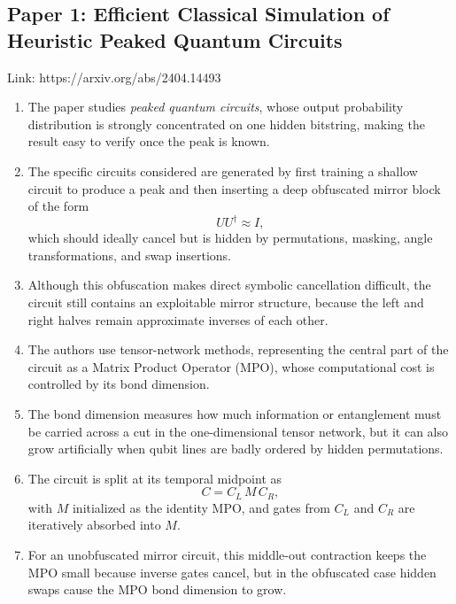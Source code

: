 \subsection{Paper 1: Efficient Classical Simulation of Heuristic Peaked Quantum Circuits}

Link: https://arxiv.org/abs/2404.14493

\begin{enumerate}
    \item The paper studies \emph{peaked quantum circuits}, whose output probability distribution is strongly concentrated on one hidden bitstring, making the result easy to verify once the peak is known.
    
    \item The specific circuits considered are generated by first training a shallow circuit to produce a peak and then inserting a deep obfuscated mirror block of the form
    \[
        U U^\dagger \approx I,
    \]
    which should ideally cancel but is hidden by permutations, masking, angle transformations, and swap insertions.
    
    \item Although this obfuscation makes direct symbolic cancellation difficult, the circuit still contains an exploitable mirror structure, because the left and right halves remain approximate inverses of each other.
    
    \item The authors use tensor-network methods, representing the central part of the circuit as a Matrix Product Operator (MPO), whose computational cost is controlled by its bond dimension.
    
    \item The bond dimension measures how much information or entanglement must be carried across a cut in the one-dimensional tensor network, but it can also grow artificially when qubit lines are badly ordered by hidden permutations.
    
    \item The circuit is split at its temporal midpoint as
    \[
        C = C_L \, M \, C_R,
    \]
    with \(M\) initialized as the identity MPO, and gates from \(C_L\) and \(C_R\) are iteratively absorbed into \(M\).
    
    \item For an unobfuscated mirror circuit, this middle-out contraction keeps the MPO small because inverse gates cancel, but in the obfuscated case hidden swaps cause the MPO bond dimension to grow.
    

\end{enumerate}
